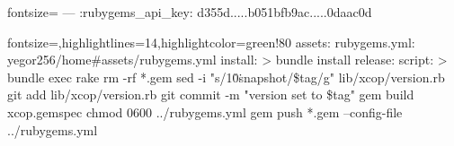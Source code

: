 \documentclass{article}
\begin{document}
\begin{ffcode*}{fontsize=\scriptsize}
---
:rubygems_api_key: d355d.....b051bfb9ac.....0daac0d
\end{ffcode*}
\flush

\begin{ffcode*}{fontsize=\scriptsize,highlightlines={14},highlightcolor=green!80}
assets:
  rubygems.yml: yegor256/home#assets/rubygems.yml
install: >
  bundle install
release:
  script: >
    bundle exec rake
    rm -rf *.gem
    sed -i "s/1\.0\.snapshot/\${tag}/g" lib/xcop/version.rb
    git add lib/xcop/version.rb
    git commit -m "version set to \${tag}"
    gem build xcop.gemspec
    chmod 0600 ../rubygems.yml
    gem push *.gem --config-file ../rubygems.yml
\end{ffcode*}
\flush

\end{document}
